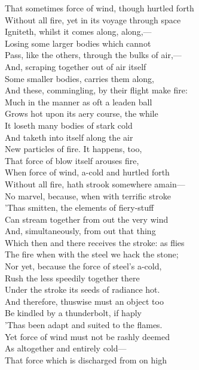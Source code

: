 That sometimes force of wind, though hurtled forth\\
Without all fire, yet in its voyage through space\\
Igniteth, whilst it comes along, along,—\\
Losing some larger bodies which cannot\\
Pass, like the others, through the bulks of air,—\\
And, scraping together out of air itself\\
Some smaller bodies, carries them along,\\
And these, commingling, by their flight make fire:\\
Much in the manner as oft a leaden ball\\
Grows hot upon its aery course, the while\\
It loseth many bodies of stark cold\\
And taketh into itself along the air\\
New particles of fire. It happens, too,\\
That force of blow itself arouses fire,\\
When force of wind, a-cold and hurtled forth\\
Without all fire, hath strook somewhere amain—\\
No marvel, because, when with terrific stroke\\
'Thas smitten, the elements of fiery-stuff\\
Can stream together from out the very wind\\
And, simultaneously, from out that thing\\
Which then and there receives the stroke: as flies\\
The fire when with the steel we hack the stone;\\
Nor yet, because the force of steel's a-cold,\\
Rush the less speedily together there\\
Under the stroke its seeds of radiance hot.\\
And therefore, thuswise must an object too\\
Be kindled by a thunderbolt, if haply\\
'Thas been adapt and suited to the flames.\\
Yet force of wind must not be rashly deemed\\
As altogether and entirely cold—\\
That force which is discharged from on high\\
